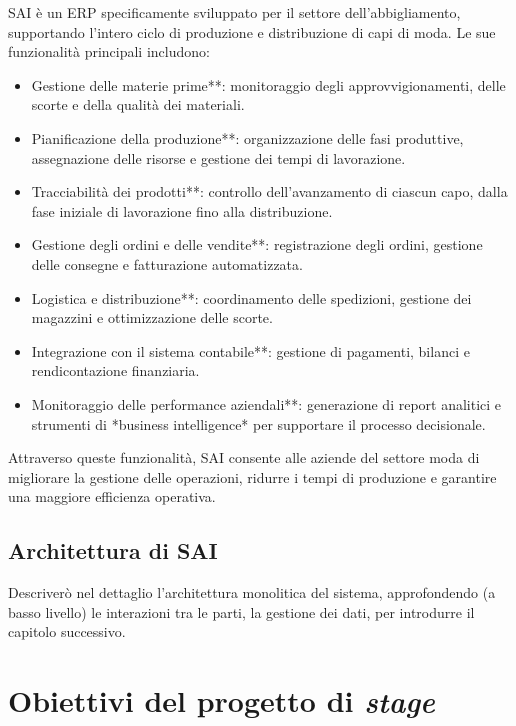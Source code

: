         \vspace{0.2 em}
        \noindent SAI è un ERP specificamente sviluppato per il settore dell'abbigliamento, supportando l’intero ciclo di produzione e distribuzione di capi di moda. Le sue funzionalità principali includono:  
        \begin{itemize}
            \item Gestione delle materie prime**: monitoraggio degli approvvigionamenti, delle scorte e della qualità dei materiali.  
            \item Pianificazione della produzione**: organizzazione delle fasi produttive, assegnazione delle risorse e gestione dei tempi di lavorazione.  
            \item Tracciabilità dei prodotti**: controllo dell’avanzamento di ciascun capo, dalla fase iniziale di lavorazione fino alla distribuzione.  
            \item Gestione degli ordini e delle vendite**: registrazione degli ordini, gestione delle consegne e fatturazione automatizzata.  
            \item Logistica e distribuzione**: coordinamento delle spedizioni, gestione dei magazzini e ottimizzazione delle scorte.  
            \item Integrazione con il sistema contabile**: gestione di pagamenti, bilanci e rendicontazione finanziaria.  
            \item Monitoraggio delle performance aziendali**: generazione di report analitici e strumenti di *business intelligence* per supportare il processo decisionale.  
        \end{itemize}

        \vspace{0.2 em}
        \noindent Attraverso queste funzionalità, SAI consente alle aziende del settore moda di migliorare la gestione delle operazioni, ridurre i tempi di produzione e garantire una maggiore efficienza operativa.
        
        \subsection{Architettura di SAI}
        Descriverò nel dettaglio l'architettura monolitica del sistema, approfondendo (a basso livello) le interazioni tra le parti, la gestione dei dati, per introdurre il capitolo successivo.
    \section{Obiettivi del progetto di \textit{stage}}
